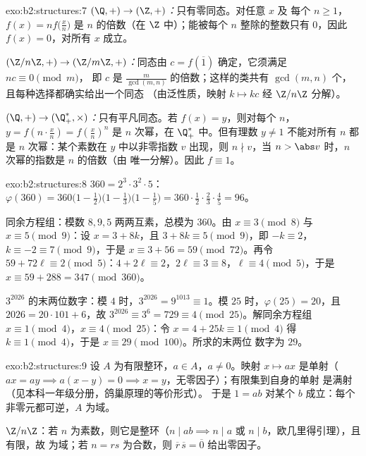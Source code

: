 \begin{solution}{exo:b2:structures:7}
\emph{$(\Q,+) \to (\Z,+)$：}只有零同态。对任意 $x$ 及
每个 $n \geq 1$，$f(x) = n f\bigl(\frac xn\bigr)$ 是
$n$ 的倍数（在 $\Z$ 中）；能被每个 $n$ 整除的整数只有 $0$，因此
$f(x) = 0$，对所有 $x$ 成立。

\emph{$(\Z/n\Z, +) \to (\Z/m\Z, +)$：}同态由
$c = f(\overline 1)$ 确定，它须满足 $n c \equiv 0 \pmod m$，
即 $c$ 是 $\frac{m}{\gcd(m,n)}$ 的倍数；这样的类共有
$\gcd(m,n)$ 个，且每种选择都确实给出一个同态
（由泛性质，映射 $k \mapsto kc$ 经 $\Z/n\Z$ 分解）。

\emph{$(\Q, +) \to (\Q_+^*, \times)$：}只有平凡同态。若
$f(x) = y$，则对每个 $n$，$y = f(n \cdot \frac xn) =
f(\frac xn)^n$ 是 $n$ 次幂，在 $\Q_+^*$ 中。但有理数
$y \neq 1$ 不能对所有 $n$ 都是 $n$ 次幂：某个素数在
$y$ 中以非零指数 $v$ 出现，则 $n \nmid v$，当 $n > \abs
v$ 时，$n$ 次幂的指数是 $n$ 的倍数（由
唯一分解）。因此 $f \equiv 1$。
\end{solution}

\begin{solution}{exo:b2:structures:8}
$360 = 2^3 \cdot 3^2 \cdot 5$：
$\varphi(360) = 360\bigl(1 - \tfrac12\bigr)\bigl(1 -
\tfrac13\bigr)\bigl(1 - \tfrac15\bigr) = 360 \cdot \tfrac12 \cdot
\tfrac23 \cdot \tfrac45 = 96$。

同余方程组：模数 $8, 9, 5$ 两两互素，总模为 $360$。由 $x
\equiv 3 \pmod 8$ 与 $x \equiv 5 \pmod 9$：设 $x = 3 + 8k$，且 $3 +
8k \equiv 5 \pmod 9$，即 $-k \equiv 2$，$k \equiv -2 \equiv 7
\pmod 9$，于是 $x \equiv 3 + 56 = 59 \pmod{72}$。再令 $59 + 72\ell \equiv
2 \pmod 5$：$4 + 2\ell \equiv 2$，$2\ell \equiv 3 \equiv 8$，$\ell
\equiv 4 \pmod 5$，于是 $x \equiv 59 + 288 = 347 \pmod{360}$。

$3^{2026}$ 的末两位数字：模 $4$ 时，$3^{2026} = 9^{1013} \equiv
1$。模 $25$ 时，$\varphi(25) = 20$，且 $2026 = 20\cdot101 + 6$，故
$3^{2026} \equiv 3^6 = 729 \equiv 4 \pmod{25}$。解同余方程组 $x \equiv 1
\pmod 4$，$x \equiv 4 \pmod{25}$：令 $x = 4 + 25k \equiv 1 \pmod 4$
得 $k \equiv 1 \pmod 4$，于是 $x \equiv 29 \pmod{100}$。所求的末两位
数字为 $29$。
\end{solution}

\begin{solution}{exo:b2:structures:9}
设 $A$ 为有限整环，$a \in A$，$a \neq 0$。映射
$x \mapsto ax$ 是单射（$ax = ay \implies a(x - y) = 0
\implies x = y$，无零因子）；有限集到自身的单射
是满射（见本科一年级分册，鸽巢原理的等价形式）。
于是 $1 = ab$ 对某个 $b$ 成立：每个非零元都可逆，$A$
为域。

$\Z/n\Z$：若 $n$ 为素数，则它是整环（$n \mid ab
\implies n \mid a$ 或 $n \mid b$，欧几里得引理），且有限，故
为域；若 $n = rs$ 为合数，则 $\overline r\,\overline s =
\overline 0$ 给出零因子。
\end{solution}

